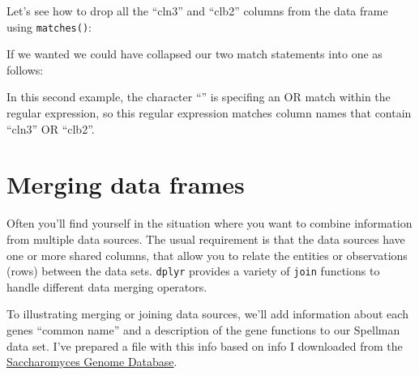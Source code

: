 \documentclass[]{book}
\newenvironment{Shaded}{\begin{snugshade}}{\end{snugshade}}
\newcommand{\KeywordTok}[1]{\textcolor[rgb]{0.13,0.29,0.53}{\textbf{#1}}}
\newcommand{\NormalTok}[1]{#1}
\newcommand{\OperatorTok}[1]{\textcolor[rgb]{0.81,0.36,0.00}{\textbf{#1}}}
\newcommand{\StringTok}[1]{\textcolor[rgb]{0.31,0.60,0.02}{#1}}
\theoremstyle{definition}
\theoremstyle{definition}
\theoremstyle{definition}
\theoremstyle{remark}
\begin{document}
Let's see how to drop all the ``cln3'' and ``clb2'' columns from the
data frame using \texttt{matches()}:

\begin{Shaded}
\end{Shaded}

If we wanted we could have collapsed our two match statements into one
as follows:

\begin{Shaded}
\end{Shaded}

In this second example, the character ``\textbar{}'' is specifing an OR
match within the regular expression, so this regular expression matches
column names that contain ``cln3'' OR ``clb2''.

\hypertarget{merging-data-frames}{%
\section{Merging data frames}\label{merging-data-frames}}

Often you'll find yourself in the situation where you want to combine
information from multiple data sources. The usual requirement is that
the data sources have one or more shared columns, that allow you to
relate the entities or observations (rows) between the data sets.
\texttt{dplyr} provides a variety of \texttt{join} functions to handle
different data merging operators.

To illustrating merging or joining data sources, we'll add information
about each genes ``common name'' and a description of the gene functions
to our Spellman data set. I've prepared a file with this info based on
info I downloaded from the
\href{https://www.yeastgenome.org}{Saccharomyces Genome Database}.
\end{document}
